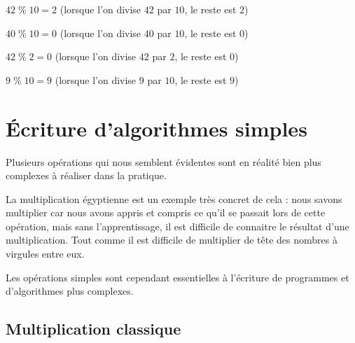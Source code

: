 \documentclass[11pt,a4paper]{article}
\begin{document}
$ 42 \; \% \; 10 = 2 $ (lorsque l'on divise $ 42 $ par $ 10 $, le reste est $ 2 $)

$ 40 \; \% \; 10 = 0 $ (lorsque l'on divise $ 40 $ par $ 10 $, le reste est $ 0 $)

$ 42 \; \% \; 2 = 0 $ (lorsque l'on divise $ 42 $ par $ 2 $, le reste est $ 0 $)

$ 9 \; \% \; 10 = 9 $ (lorsque l'on divise $ 9 $ par $ 10 $, le reste est $ 9 $)


\vfillLast

\clearpage


\section{\'Ecriture d'algorithmes simples}

\bigskip

Plusieurs opérations qui nous semblent évidentes sont en réalité bien plus complexes à réaliser dans la pratique.

La multiplication égyptienne est un exemple très concret de cela : nous savons multiplier car nous avons appris et compris ce qu'il se passait lors de cette opération, mais sans l'apprentissage, il est difficile de connaitre le résultat d'une multiplication.
Tout comme il est difficile de multiplier de tête des nombres à virgules entre eux.

Les opérations simples sont cependant essentielles à l'écriture de programmes et d'algorithmes plus complexes.

\bigskip

\vspace*{3cm}


\subsection{Multiplication classique}

\bigskip


\bigskip

\vspace*{0.5cm}
\end{document}

